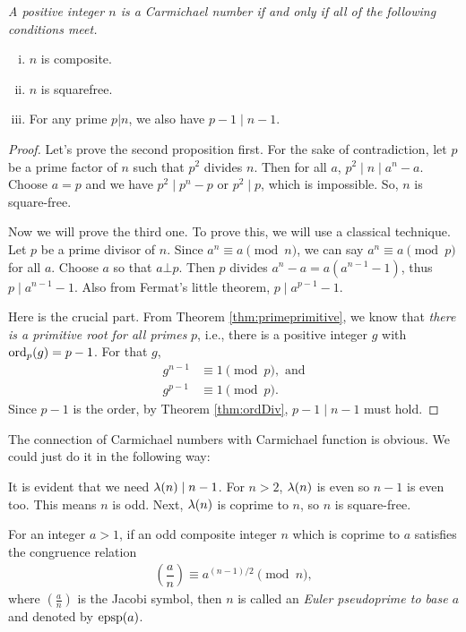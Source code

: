\documentclass{subfile}
\begin{document}
	\begin{theorem}\slshape
		A positive integer $n$ is a Carmichael number if and only if all of the following conditions meet.
		\begin{enumerate}[i.]
			\item $n$ is composite.
			\item $n$ is squarefree.
			\item For any prime $p|n$, we also have $p-1 \mid n-1$.
		\end{enumerate}
	\end{theorem}
	
	\begin{proof}
		Let's prove the second proposition first. For the sake of contradiction, let $p$ be a prime factor of $n$ such that $p^2$ divides $n$. Then for all $a$, $p^2 \mid n \mid a^n-a$. Choose $a=p$ and we have $p^2 \mid p^n-p$ or $p^2 \mid p$, which is impossible. So, $n$ is square-free.
		
		Now we will prove the third one. To prove this, we will use a classical technique. Let $p$ be a prime divisor of $n$. Since $a^n\equiv a\pmod n$, we can say $a^n\equiv a\pmod p$ for all $a$. Choose $a$ so that $a\bot p$. Then $p$ divides $a^n-a=a(a^{n-1}-1)$, thus $p \mid a^{n-1}-1$. Also from Fermat's little theorem, $p \mid a^{p-1}-1$.
		
		Here is the crucial part. From Theorem \ref{thm:primeprimitive}, we know that \textit{there is a primitive root for all primes} $p$, i.e., there is a positive integer $g$ with $\operatorname{ord}_p(g)=p-1$. For that $g$,
		\begin{align*}
		g^{n-1} & \equiv1\pmod p,\text { and}\\
		g^{p-1} & \equiv1\pmod p.
		\end{align*}
		Since $p-1$ is the order, by Theorem \ref{thm:ordDiv}, $p-1 \mid n-1$ must hold.
	\end{proof}
	
	\begin{note}
		The connection of Carmichael numbers with Carmichael function is obvious. We could just do it in the following way:
		
		It is evident that we need $\lambda(n)\mid n-1$. For $n>2$, $\lambda(n)$ is even so $n-1$ is even too. This means $n$ is odd. Next, $\lambda(n)$ is coprime to $n$, so $n$ is square-free.
	\end{note}
	
	\begin{definition}\label{def:eulerpseudoprime}
		For an integer $a>1$, if an odd composite integer $n$ which is coprime to $a$ satisfies the congruence relation
			\begin{align*}
				\left(\dfrac{a}{n}\right) \equiv a^{(n-1)/2} \pmod n,
			\end{align*} 
		where $\left(\frac{a}{n}\right)$ is the Jacobi symbol, then $n$ is called an \textit{Euler pseudoprime to base $a$} and denoted by $\operatorname{epsp}(a)$.
	\end{definition}
	
\end{document}
